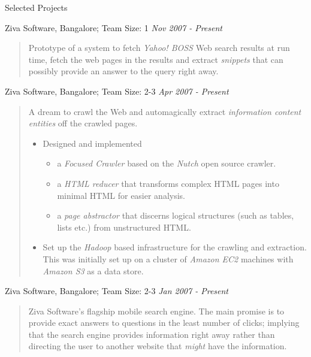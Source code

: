 \documentclass{resume}
\newcommand{\period}{\hfill\small\sl}
\newcommand{\teamsize}{\sc\footnotesize Team Size: }
\begin{document}
\begin{category}{Selected Projects}

     Ziva Software, Bangalore; {\teamsize 1} {\period Nov 2007 - Present}
    \begin{quotation}
        Prototype of a system to fetch {\em Yahoo! BOSS} Web search results at run time, fetch the web pages in the results and extract {\em snippets} that can possibly provide an answer to the query right away.
    \end{quotation}

     Ziva Software, Bangalore; {\teamsize 2-3} {\period Apr 2007 - Present}
    \begin{quotation}
        A dream to crawl the Web and automagically extract {\em information content entities} off the crawled pages.

        \begin{itemize}
            \item Designed and implemented
                \begin{itemize}
                    \item a {\em Focused Crawler} based on the {\em Nutch} open source crawler.
                    \item a {\em HTML reducer} that transforms complex HTML pages into minimal HTML for easier analysis.
                    \item a {\em page abstractor} that discerns logical structures (such as tables, lists etc.) from unstructured HTML.
                \end{itemize}
            \item Set up the {\em Hadoop} based infrastructure for the crawling and extraction.
                This was initially set up on a cluster of {\em Amazon EC2} machines with {\em Amazon S3} as a data store.
        \end{itemize}
    \end{quotation}

     Ziva Software, Bangalore; {\teamsize 2-3} {\period Jan 2007 - Present}
    \begin{quotation}
        Ziva Software's flagship mobile search engine. The main promise is to provide exact answers to questions in the least number of clicks; implying that the search engine provides information right away rather than directing the user to another website that {\em might} have the information.


\end{quotation}
\end{category}
\end{document}
